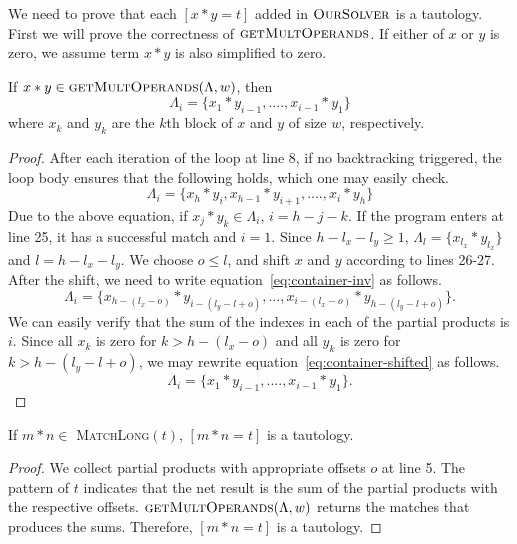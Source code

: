 We need to prove that each $[x*y = t]$ added in $\textsc{OurSolver}$
is a tautology.
%
First we will prove the correctness of $\textsc{getMultOperands}$.
%
If either of $x$ or $y$ is zero, we assume term $x*y$ is also simplified to zero.
\begin{thm}
 If $ x*y \in \textsc{getMultOperands}(\Lambda,w)$, then
 $$
 \Lambda_i = \{ x_1*y_{i-1},....,x_{i-1}*y_1 \}
 $$
  where $x_k$ and $y_k$ are the $k$th block of $x$ and $y$ of size
$w$, respectively.
\end{thm}
\begin{proof}
  After each iteration of the loop at line 8,
  if no backtracking triggered, the loop body ensures
  that the following holds, which one may easily check.
  \begin{equation}
    \label{eq:container-inv}
  \Lambda_i = \{ x_h*y_{i}, x_{h-1}*y_{i+1},....,x_{i}*y_h \}    
  \end{equation}
  Due to the above equation,
  if $x_j*y_k \in \Lambda_i$, $ i = h-j-k$.
  If the program enters at line 25, it has a successful match and $i=1$.
  Since $h-l_x -l_y \geq 1$, $\Lambda_l = \{x_{l_x}*y_{l_x}\}$
  and $l = h - l_x - l_y$.
  We choose $o \leq l$, and shift $x$ and $y$ according to lines 26-27.
  After the shift, we need to write equation~\eqref{eq:container-inv}
  as follows.
  \begin{equation}
    \label{eq:container-shifted}
    \Lambda_i = \{ x_{h-(l_x-o)}*y_{i-(l_y-l+o)},...,x_{i-(l_x-o)}*y_{h-(l_y-l+o)} \}.
  \end{equation}
  We can easily verify that the sum of the indexes in each of
  the partial products is $i$.
  Since all $x_k$ is zero for $k > h-(l_x-o)$ and all $y_k$ is zero
  for $k > h-(l_y-l+o)$,
  we may rewrite equation~\eqref{eq:container-shifted}
 as follows.
  $$
  \Lambda_i = \{ x_1*y_{i-1},....,x_{i-1}*y_1 \}.
  $$
\end{proof}

\begin{thm}
  If $m*n\in$ \textsc{MatchLong}$(t)$, $[m*n = t]$ is a tautology.
\end{thm}
\begin{proof}
  We collect partial products with appropriate offsets $o$ at line 5.
  The pattern of $t$ indicates that the net result is the sum of the 
  partial products with the respective offsets. 
  $\textsc{getMultOperands}(\Lambda,w)$ returns the
  matches that produces the sums.
  Therefore, $[m*n = t]$ is a tautology.
\end{proof}

